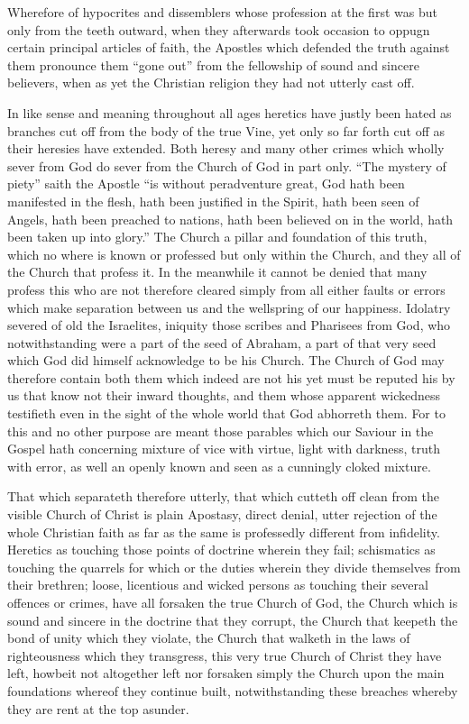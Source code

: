 Wherefore of hypocrites and dissemblers whose profession at the first was but only from the teeth outward, when they afterwards took occasion to oppugn certain principal articles of faith, the Apostles which defended the truth against them pronounce them “gone out” from the fellowship of sound and sincere believers, when as yet the Christian religion they had not utterly cast off.

In like sense and meaning throughout all ages heretics have justly been hated as branches cut off from the body of the true Vine, yet only so far forth cut off as their heresies have extended. Both heresy and many other crimes which wholly sever from God do sever from the Church of God in part only. “The mystery of piety” saith the Apostle “is without peradventure great, God hath been manifested in the flesh, hath been justified in the Spirit, hath been seen of Angels, hath been preached to nations, hath been believed on in the world, hath been taken up into glory.” The Church a pillar and foundation of this truth, which no where is known or professed but only within the Church, and they all of the Church that profess it. In the meanwhile it cannot be denied that many profess this who are not therefore cleared simply from all either faults or errors which make separation between us and the wellspring of our happiness. Idolatry severed of old the Israelites, iniquity those scribes and Pharisees from God, who notwithstanding were a part of the seed of Abraham, a part of that very seed which God did himself acknowledge to be his Church. The Church of God may therefore contain both them which indeed are not his yet must be reputed his by us that know not their inward thoughts, and them whose  apparent wickedness testifieth even in the sight of the whole world that God abhorreth them.
 For to this and no other purpose are meant those parables which our Saviour in the Gospel hath concerning mixture of vice with virtue, light with darkness, truth with error, as well an openly known and seen as a cunningly cloked mixture.

That which separateth therefore utterly, that which cutteth off clean from the visible Church of Christ is plain Apostasy, direct denial, utter rejection of the whole Christian faith as far as the same is professedly different from infidelity. Heretics as touching those points of doctrine wherein they fail; schismatics as touching the quarrels for which or the duties wherein they divide themselves from their brethren; loose, licentious and wicked persons as touching their several offences or crimes, have all forsaken the true Church of God, the Church which is sound and sincere in the doctrine that they corrupt, the Church that keepeth the bond of unity which they violate, the Church that walketh in the laws of righteousness which they transgress, this very true Church of Christ they have left, howbeit not altogether left nor forsaken simply the Church upon the main foundations whereof they continue built, notwithstanding these breaches whereby they are rent at the top asunder.

